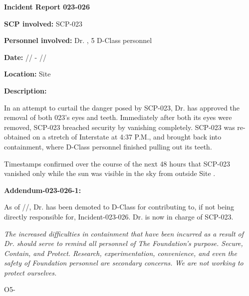 \textbf{Incident Report 023-026}

\textbf{SCP involved:} SCP-023

\textbf{Personnel involved:} Dr. , 5 D-Class personnel

\textbf{Date:} // - //

\textbf{Location:} Site 

\textbf{Description:}

In an attempt to curtail the danger posed by SCP-023, Dr.  has approved the removal of both 023's eyes and teeth. Immediately after both its eyes were removed, SCP-023 breached security by vanishing completely. SCP-023 was re-obtained on a stretch of Interstate  at 4:37 P.M., and brought back into containment, where D-Class personnel finished pulling out its teeth.

Timestamps confirmed over the course of the next 48 hours that SCP-023 vanished only while the sun was visible in the sky from outside Site .

\textbf{Addendum-023-026-1:}

As of //, Dr.  has been demoted to D-Class for contributing to, if not being directly responsible for, Incident-023-026. Dr.  is now in charge of SCP-023.

\textsl{The increased difficulties in containment that have been incurred as a result of Dr.  should serve to remind all personnel of The Foundation's purpose. Secure, Contain, and Protect. Research, experimentation, convenience, and even the safety of Foundation personnel are secondary concerns. We are not working to protect ourselves.}

O5-